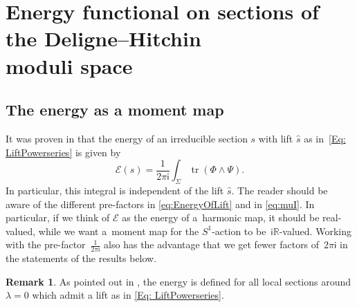 \documentclass[pdftex]{sigma}
\numberwithin{equation}{section}
\theoremstyle{definition}
\newtheorem{Remark}[Theorem]{Remark}
\newcommand{\R}{{\mathbb R}}
\renewcommand{\i}{\mathsf{i}}
\begin{document}
\section[Energy functional on sections of the Deligne--Hitchin moduli space]{Energy functional on sections of the Deligne--Hitchin\\ moduli space}\label{ss:GeometrySectionDH}

\subsection{The energy as a moment map}

It was proven in \cite[Corollary 3.11]{BeHeRo} that the energy of an irreducible section $s$ with lift $\widehat{s}$ as in~\eqref{Eq: LiftPowerseries} is given by
\begin{equation}\label{eq:EnergyOfLift}
\mathcal{E}(s) = \frac{1}{2\pi \i} \int_{\Sigma} \operatorname{tr}( \Phi \wedge \Psi).
\end{equation}
In particular, this integral is independent of the lift $\widehat{s}$.
The reader should be aware of the different pre-factors in \eqref{eq:EnergyOfLift} and in \eqref{eq:muI}.
In particular, if we think of $\mathcal E$ as the energy of a~harmonic map, it should be real-valued, while we want a~moment map
for the $S^1$-action to be~$\i\R$-valued. Working with the pre-factor~$\frac{1}{2\pi \i}$ also has the advantage that we get fewer factors of~$2\pi \i$ in the statements of the results below.

\begin{Remark}
As pointed out in \cite[Remark 2.3]{BHR}, the energy is defined
for all local sections around $\lambda = 0$ which admit a lift as in \eqref{Eq: LiftPowerseries}.
\end{Remark}
\end{document}
